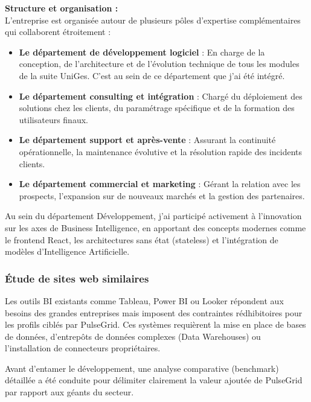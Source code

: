 ﻿\documentclass[12pt,a4paper,oneside]{report} %
\begin{document}
\textbf{Structure et organisation :}\\
L'entreprise est organisée autour de plusieurs pôles d'expertise complémentaires qui collaborent étroitement :
\begin{itemize}
    \item \textbf{Le département de développement logiciel} : En charge de la conception, de l'architecture et de l'évolution technique de tous les modules de la suite UniGes. C'est au sein de ce département que j'ai été intégré.
    \item \textbf{Le département consulting et intégration} : Chargé du déploiement des solutions chez les clients, du paramétrage spécifique et de la formation des utilisateurs finaux.
    \item \textbf{Le département support et après-vente} : Assurant la continuité opérationnelle, la maintenance évolutive et la résolution rapide des incidents clients.
    \item \textbf{Le département commercial et marketing} : Gérant la relation avec les prospects, l'expansion sur de nouveaux marchés et la gestion des partenaires.
\end{itemize}

Au sein du département Développement, j'ai participé activement à l'innovation sur les axes de Business Intelligence, en apportant des concepts modernes comme le frontend React, les architectures sans état (stateless) et l'intégration de modèles d'Intelligence Artificielle.

\subsubsection{Étude de sites web similaires}

Les outils BI existants comme Tableau, Power BI ou Looker répondent aux besoins des grandes entreprises mais imposent des contraintes rédhibitoires pour les profils ciblés par PulseGrid. Ces systèmes requièrent la mise en place de bases de données, d'entrepôts de données complexes (Data Warehouses) ou l'installation de connecteurs propriétaires.

Avant d'entamer le développement, une analyse comparative (benchmark) détaillée a été conduite pour délimiter clairement la valeur ajoutée de PulseGrid par rapport aux géants du secteur.
\end{document}
